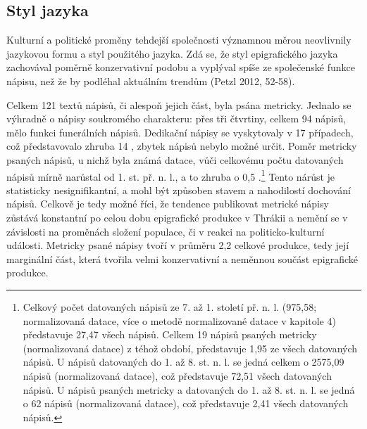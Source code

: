 
\subsection[styl-jazyka]{Styl jazyka}

Kulturní a politické proměny tehdejší společnosti významnou měrou neovlivnily jazykovou formu a styl použitého jazyka. Zdá se, že styl epigrafického jazyka zachovával poměrně konzervativní podobu a vyplýval spíše ze společenské funkce nápisu, než že by podléhal aktuálním trendům (Petzl 2012, 52-58).

Celkem 121 textů nápisů, či alespoň jejich část, byla psána metricky. Jednalo se výhradně o nápisy soukromého charakteru: přes tři čtvrtiny, celkem 94 nápisů, mělo funkci funerálních nápisů. Dedikační nápisy se vyskytovaly v 17 případech, což představovalo zhruba 14 , zbytek nápisů nebylo možné určit. Poměr metricky psaných nápisů, u nichž byla známá datace, vůči celkovému počtu datovaných nápisů mírně narůstal od 1. st. př. n. l., a to zhruba o 0,5 .\footnote{Celkový počet datovaných nápisů ze 7. až 1. století př. n. l. (975,58; normalizovaná datace, více o metodě normalizované datace v kapitole 4) představuje 27,47  všech nápisů. Celkem 19 nápisů psaných metricky (normalizovaná datace) z téhož období, představuje 1,95  ze všech datovaných nápisů. U nápisů datovaných do 1. až 8. st. n. l. se jedná celkem o 2575,09 nápisů (normalizovaná datace), což představuje 72,51  všech datovaných nápisů. U nápisů psaných metricky a datovaných do 1. až 8. st. n. l. se jedná o 62 nápisů (normalizovaná datace), což představuje 2,41  všech datovaných nápisů.} Tento nárůst je statisticky nesignifikantní, a mohl být způsoben stavem a nahodilostí dochování nápisů. Celkově je tedy možné říci, že tendence publikovat metrické nápisy zůstává konstantní po celou dobu epigrafické produkce v Thrákii a nemění se v závislosti na proměnách složení populace, či v reakci na politicko-kulturní události. Metricky psané nápisy tvoří v průměru 2,2  celkové produkce, tedy její marginální část, která tvořila velmi konzervativní a neměnnou součást epigrafické produkce.


